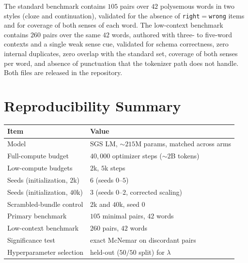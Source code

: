 \documentclass[twoside,11pt]{article}
\begin{document}
The standard benchmark contains $105$ pairs over $42$ polysemous words in two styles (cloze and continuation), validated for the absence of \texttt{right}$=$\texttt{wrong} items and for coverage of both senses of each word. The low-context benchmark contains $260$ pairs over the same $42$ words, authored with three- to five-word contexts and a single weak sense cue, validated for schema correctness, zero internal duplicates, zero overlap with the standard set, coverage of both senses per word, and absence of punctuation that the tokenizer path does not handle. Both files are released in the repository.

\section{Reproducibility Summary}
\label{app:repro}

\begin{center}
\begin{tabular}{ll}
\toprule
Item & Value \\
\midrule
Model & SGS LM, $\sim$$215$M params, matched across arms \\
Full-compute budget & $40{,}000$ optimizer steps ($\sim$$2$B tokens) \\
Low-compute budgets & $2$k, $5$k steps \\
Seeds (initialization, $2$k) & $6$ (seeds $0$--$5$) \\
Seeds (initialization, $40$k) & $3$ (seeds $0$--$2$, corrected scaling) \\
Scrambled-bundle control & $2$k and $40$k, seed $0$ \\
Primary benchmark & $105$ minimal pairs, $42$ words \\
Low-context benchmark & $260$ pairs, $42$ words \\
Significance test & exact McNemar on discordant pairs \\
Hyperparameter selection & held-out ($50/50$ split) for $\lambda$ \\
\bottomrule
\end{tabular}
\end{center}
\end{document}
